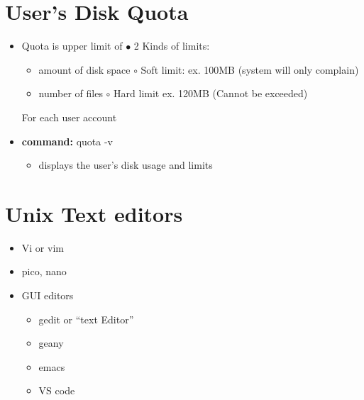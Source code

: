 \documentclass{report}
\begin{document}
\section{User's Disk Quota}
\begin{itemize}
  \item Quota is upper limit of \hspace{20mm} $\bullet$ 2 Kinds of limits:
    \begin{itemize}[label=$\circ$]
      \item amount of disk space  \hspace{20mm} $\circ$ Soft limit: ex. 100MB (system will only complain)
      \item number of files \hspace{30mm} $\circ$ Hard limit ex. 120MB (Cannot be exceeded)
    \end{itemize}
    For each user account
    \bigbreak \noindent
  \item \textbf{command:} quota -v
    \begin{itemize}[label=$\circ$]
      \item displays the user's disk usage and limits
    \end{itemize}
\end{itemize}
\section{Unix Text editors}
\begin{itemize}
  \item Vi or vim 
  \item pico, nano
  \bigbreak \noindent
\item GUI editors
  \begin{itemize}[label=$\circ$]
    \item gedit or ``text Editor'' 
    \item geany
    \item emacs
    \item VS code
  \end{itemize}
\end{itemize}
\end{document}
